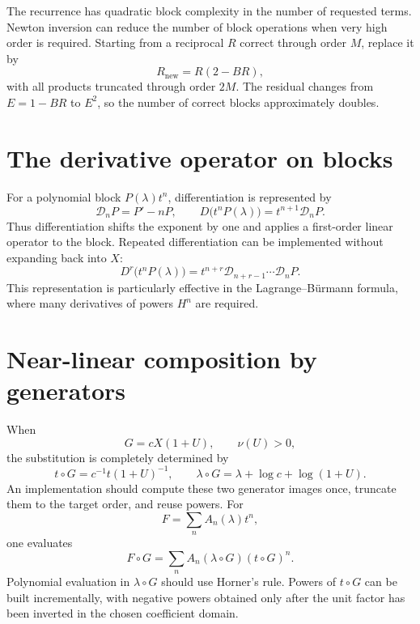 \documentclass[11pt,openany]{book}
\theoremstyle{definition}
\theoremstyle{plain}
\theoremstyle{remark}
\newcommand{\val}{\nu}
\begin{document}
The recurrence has quadratic block complexity in the number of requested terms. Newton inversion can reduce the number of block operations when very high order is required. Starting from a reciprocal \(R\) correct through order \(M\), replace it by
\begin{equation}\label{eq:newton-reciprocal-implementation}
 R_{\mathrm{new}}=R(2-BR),
\end{equation}
with all products truncated through order \(2M\). The residual changes from \(E=1-BR\) to \(E^2\), so the number of correct blocks approximately doubles.


\section{The derivative operator on blocks}
For a polynomial block \(P(\lambda)t^n\), differentiation is represented by
\[
 \mathcal D_nP=P'-nP,
 \qquad
 D\bigl(t^nP(\lambda)\bigr)=t^{n+1}\mathcal D_nP.
\]
Thus differentiation shifts the exponent by one and applies a first-order linear operator to the block. Repeated differentiation can be implemented without expanding back into \(X\):
\begin{equation}\label{eq:iterated-block-operator}
 D^r\bigl(t^nP(\lambda)\bigr)
 =t^{n+r}\mathcal D_{n+r-1}\cdots\mathcal D_nP.
\end{equation}
This representation is particularly effective in the Lagrange--B\"urmann formula, where many derivatives of powers \(H^n\) are required.

\section{Near-linear composition by generators}
When
\[
 G=cX(1+U),\qquad \val(U)>0,
\]
the substitution is completely determined by
\begin{equation}\label{eq:implementation-generators}
 t\circ G=c^{-1}t(1+U)^{-1},
 \qquad
 \lambda\circ G=\lambda+\log c+\log(1+U).
\end{equation}
An implementation should compute these two generator images once, truncate them to the target order, and reuse powers. For
\[
 F=\sum_n A_n(\lambda)t^n,
\]
one evaluates
\begin{equation}\label{eq:composition-generator-eval}
 F\circ G
 =\sum_n A_n(\lambda\circ G)(t\circ G)^n.
\end{equation}
Polynomial evaluation in \(\lambda\circ G\) should use Horner's rule. Powers of \(t\circ G\) can be built incrementally, with negative powers obtained only after the unit factor has been inverted in the chosen coefficient domain.
\end{document}
